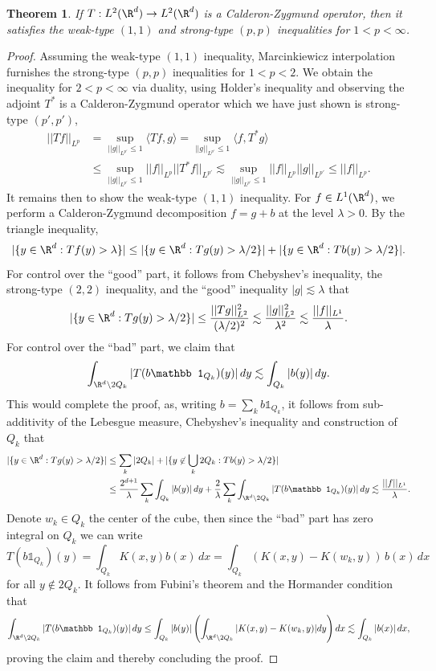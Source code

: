 \documentclass[reqno]{amsart}
\newtheorem{theorem}{Theorem}
\theoremstyle{definition}
\theoremstyle{remark}
\begin{document}
\begin{theorem}
	If $T: L^2 (\R^d) \to L^2 (\R^d)$ is a Calderon-Zygmund operator, then it satisfies the weak-type $(1, 1)$ and strong-type $(p,p)$ inequalities for $1 < p < \infty$. 
\end{theorem}

\begin{proof}
	Assuming the weak-type $(1, 1)$ inequality, Marcinkiewicz interpolation furnishes the strong-type $(p, p)$ inequalities for $1 < p < 2$. We obtain the inequality for $2 < p < \infty$ via duality, using Holder's inequality and observing the adjoint $T^*$ is a Calderon-Zygmund operator which we have just shown is strong-type $(p', p')$, 
		\begin{align*}
			||T f||_{L^p}
				&= \sup_{||g||_{L^{p'}} \leq 1} \langle Tf, g \rangle = \sup_{||g||_{L^{p'}} \leq 1} \langle f, T^* g \rangle\\
				&\leq  \sup_{||g||_{L^{p'}} \leq 1} ||f||_{L^p} ||T^* f ||_{L^{p'}} \lesssim \sup_{||g||_{L^{p'}} \leq 1} ||f||_{L^p} ||g||_{L^{p'}} \leq ||f||_{L^p}.
		\end{align*}
	It remains then to show the weak-type $(1, 1)$ inequality. For $f \in L^1 (\R^d)$, we perform a Calderon-Zygmund decomposition $f = g + b$ at the level $\lambda > 0$. By the triangle inequality, 
		\[ |\{ y \in \R^d : Tf (y) > \lambda \}| \leq |\{ y \in \R^d : Tg (y) > \lambda/2 \}| + |\{ y \in \R^d : Tb (y) > \lambda/2 \}|. \]
	For control over the ``good'' part, it follows from Chebyshev's inequality, the strong-type $(2, 2)$ inequality, and the ``good'' inequality $|g| \lesssim \lambda$ that 
		\[ |\{ y \in \R^d : Tg (y) > \lambda/2 \}| \leq \frac{||Tg||_{L^2}^2}{(\lambda/2)^2} \lesssim \frac{||g||_{L^2}^2}{\lambda^2} \lesssim \frac{||f||_{L^1}}{\lambda}. \]
	For control over the ``bad'' part, we claim that 
		\[ \int_{\R^d \setminus 2Q_k}  |T(b \mathbb 1_{Q_k})(y)| \, dy \lesssim \int_{Q_k} |b(y)| \, dy. \]
	This would complete the proof, as, writing $b = \sum_k b \mathbb 1_{Q_k}$, it follows from sub-additivity of the Lebesgue measure, Chebyshev's inequality and construction of $Q_k$ that 
		\begin{align*}
			 |\{ y \in \R^d : Tg (y) > \lambda/2 \}| 
			 	&\leq \sum_k |2Q_k| + |\{ y \not\in \bigcup_k 2Q_k : Tb(y) > \lambda/2 \}|  \\
			 	&\leq \frac{2^{d + 1}}{\lambda} \sum_k \int_{Q_k} |b(y)| \, dy + \frac2\lambda \sum_k \int_{\R^d \setminus 2Q_k} |T(b \mathbb 1_{Q_k})(y)| \, dy \lesssim \frac{||f||_{L^1}}{\lambda} .
		\end{align*}	 
	Denote $w_k \in Q_k$ the center of the cube, then since the ``bad'' part has zero integral on $Q_k$ we can write 
		\[ T(b \mathbb 1_{Q_k}) (y) = \int_{Q_k} K(x, y) b(x) \, dx = \int_{Q_k} (K(x, y) - K(w_k, y)) \, b(x) \, dx \]
	for all $y \not\in 2Q_k$. It follows from Fubini's theorem and the Hormander condition that 
		\[ \int_{\R^d \setminus 2Q_k}  |T(b \mathbb 1_{Q_k})(y)| \, dy \leq \int_{Q_k} |b(y)| \left( \int_{\R^d \setminus 2Q_k} | K(x, y) - K(w_k, y)| dy \right) dx \lesssim \int_{Q_k} |b(x)| \, dx, \]	
	proving the claim and thereby concluding the proof. 
\end{proof}
\end{document}
